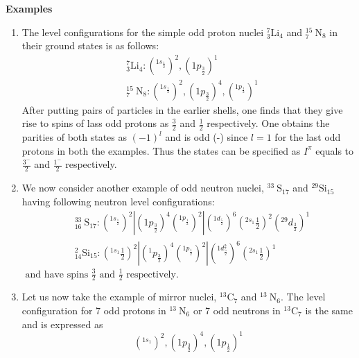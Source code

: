 \textbf{Examples}\\
\begin{enumerate}
	\item The level configurations for the simple odd proton nuclei ${ }_{3}^{7} \mathrm{Li}_{4}$ and ${ }_{7}^{15} \mathrm{~N}_{8}$ in their ground states is as follows:\\
	\begin{align*}
		&{ }_{3}^{7} \mathrm{Li}_{4}:\left({ }^{1 s_{\frac{1}{2}}}\right)^{2},\left(1 p_{\frac{3}{2}}\right)^{1} \\
		&{ }_{7}^{15} \mathrm{~N}_{8}:\left({ }^{1 s_{\frac{1}{2}}}\right)^{2},\left(1 p_{\frac{3}{2}}\right)^{4},\left({ }^{1 p_{\frac{1}{2}}}\right)^{1}
	\end{align*}
	After putting pairs of particles in the earlier shells, one finds that they give rise to spins of lass odd protons as $\frac{3}{2}$ and $\frac{1}{2}$ respectively. One obtains the parities of both states as $(-1)^{l}$ and is odd (-) since $l=1$ for the last odd protons in both the examples. Thus the states can be specified as $I^{\pi}$ equals to $\frac{3^{-}}{2}$ and $\frac{1^{-}}{2}$ respectively.
	\item We now consider another example of odd neutron nuclei, ${ }^{33} \mathrm{~S}_{17}$ and ${ }^{29} \mathrm{Si}_{15}$ having following neutron level configurations:\\
	\begin{align*}
	&{ }_{16}^{33} \mathrm{~S}_{17}:\left({ }^{1 s_{\frac{1}{2}}}\right)^{2}\left|\left(1 p_{\frac{3}{2}}\right)^{4}\left({ }^{1 p_{\frac{1}{2}}}\right)^{2}\right|\left({ }^{1 d_{\frac{5}{2}}}\right)^{6}\left({ }^{2 s_{1}} \frac{1}{2}\right)^{2}\left({ }^{29} d_{\frac{3}{2}}\right)^{1} \\
	&{ }_{14}^{2} \mathrm{Si}_{15}:\left({ }^{1 s_{1}} \frac{1}{2}\right)^{2}\left|\left({ }^{1} p_{\frac{3}{2}}\right)^{4}\left({ }^{1 p_{\frac{1}{2}}}\right)^{2}\right|\left({ }^{1 d_{\frac{5}{2}}^{2}}\right)^{6}\left({ }^{2 s_{1}} \frac{1}{2}\right)^{1}
	\end{align*}
	$\text { and have spins } \frac{3}{2} \text { and } \frac{1}{2} \text { respectively. }$
	\item Let us now take the example of mirror nuclei, ${ }^{13} \mathrm{C}_{7}$ and ${ }^{13} \mathrm{~N}_{6}$. The level configuration for 7 odd protons in ${ }^{13} \mathrm{~N}_{6}$ or 7 odd neutrons in ${ }^{13} \mathrm{C}_{7}$ is the same and is expressed as\\
	$$
	\left({ }^{1 s_{1}}\right)^{2},\left(1 p_{\frac{3}{2}}\right)^{4},\left(1 p_{\frac{1}{2}}\right)^{1}
$$
\end{enumerate}
